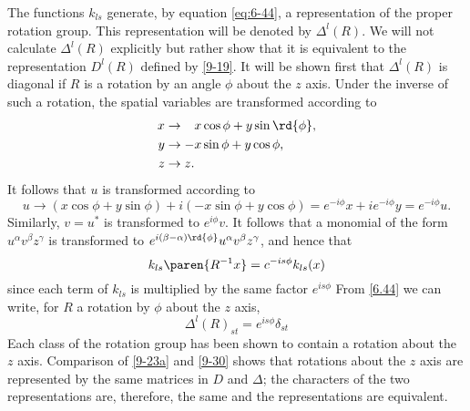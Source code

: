 The functions $k_{ls}$ generate, by equation \eqref{eq:6-44}, a representation of the proper rotation group. This representation will be denoted by $\Delta^{l}(R)$. We will not calculate $\Delta^{l}(R)$ explicitly but rather show that it is equivalent to the representation $D^{l}(R)$ defined by \eqref{9-19}. It will be shown first that $\Delta^{l}(R)$ is diagonal if $R$ is a rotation by an angle $\phi$ about the $z$ axis. Under the inverse of such a rotation, the spatial variables are transformed according to
\begin{equation*}
  \begin{split}
    x & \to \phantom{-}x\cos \phi + y\sin {\rd{\phi}}, \\
    y & \to -x\sin \phi + y \cos \phi, \\
    z & \to z .
  \end{split}
\end{equation*}
It follows that $u$ is transformed according to 
$$u\to (x\cos \phi + y\sin \phi) + i(-x\sin \phi + y \cos \phi) = e^{-i\phi}x + i e^{-i\phi}y = e^{-i\phi}u.$$ 
Similarly, $v = u^{*}$ is transformed to $e^{i\phi} v$. It follows that a monomial of the form $u^{\alpha}v^{\beta}z^{\gamma}$ is transformed to $e^{i(\beta-\alpha){\rd{\phi}}}u^{\alpha}v^{\beta}z^{\gamma}$, and hence that
%
$$k_{ls}\paren{R^{-1}x} = c^{-is \phi}k_{ls}(x)$$
%
since each term of $k_{ls}$ is multiplied by the same factor $e^{is\phi}$ From \eqref{6.44} we can write, for $R$ a rotation by $\phi$ about the $z$ axis,
  \begin{equation}
    \Delta^{l}(R)_{st} = e^{is\phi}\delta_{st}
  \label{9-30}
  \end{equation}
Each class of the rotation group has been shown to contain a rotation about the $z$ axis. Comparison of \eqref{9-23a} and \eqref{9-30} shows that rotations about the $z$ axis are represented by the same matrices in $D$ and $\Delta$; the characters of the two representations are, therefore, the same and the representations are equivalent.

